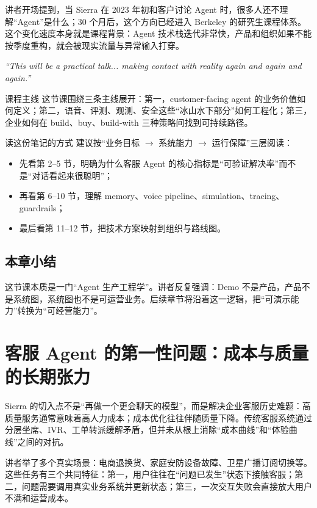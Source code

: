 \documentclass[a4paper]{article}
\begin{document}
讲者开场提到，当 Sierra 在 2023 年初和客户讨论 Agent 时，很多人还不理解“Agent”是什么；30 个月后，这个方向已经进入 Berkeley 的研究生课程体系。这个变化速度本身就是课程背景：Agent 技术栈迭代非常快，产品和组织如果不能按季度重构，就会被现实流量与异常输入打穿。

\textit{``This will be a practical talk... making contact with reality again and again and again.''}

\begin{knowledgebox}{课程主线}
这节课围绕三条主线展开：第一，customer-facing agent 的业务价值如何定义；第二，语音、评测、观测、安全这些“冰山水下部分”如何工程化；第三，企业如何在 build、buy、build-with 三种策略间找到可持续路径。
\end{knowledgebox}

\begin{importantbox}{读这份笔记的方式}
建议按“业务目标 $\rightarrow$ 系统能力 $\rightarrow$ 运行保障”三层阅读：
\begin{itemize}[leftmargin=1.5em]
    \item 先看第 2--5 节，明确为什么客服 Agent 的核心指标是“可验证解决率”而不是“对话看起来很聪明”；
    \item 再看第 6--10 节，理解 memory、voice pipeline、simulation、tracing、guardrails；
    \item 最后看第 11--12 节，把技术方案映射到组织与路线图。
\end{itemize}
\end{importantbox}

\subsection{本章小结}

这节课本质是一门“Agent 生产工程学”。讲者反复强调：Demo 不是产品，产品不是系统图，系统图也不是可运营业务。后续章节将沿着这一逻辑，把“可演示能力”转换为“可经营能力”。

\section{客服 Agent 的第一性问题：成本与质量的长期张力}

Sierra 的切入点不是“再做一个更会聊天的模型”，而是解决企业客服历史难题：高质量服务通常意味着高人力成本；成本优化往往伴随质量下降。传统客服系统通过分层坐席、IVR、工单转派缓解矛盾，但并未从根上消除“成本曲线”和“体验曲线”之间的对抗。

讲者举了多个真实场景：电商退换货、家庭安防设备故障、卫星广播订阅切换等。这些任务有三个共同特征：第一，用户往往在“问题已发生”状态下接触客服；第二，问题需要调用真实业务系统并更新状态；第三，一次交互失败会直接放大用户不满和运营成本。
\end{document}
